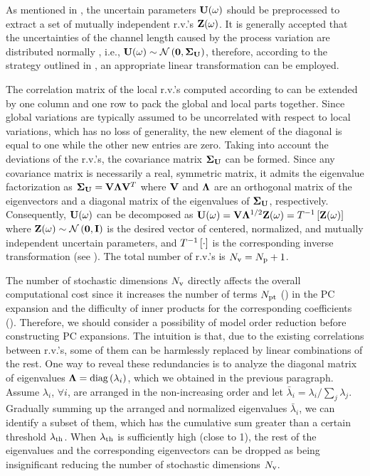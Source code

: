 As mentioned in , the uncertain parameters $\mathbf{U}(\omega)$ should be preprocessed to extract a set of mutually independent r.v.'s $\mathbf{Z}(\omega)$. It is generally accepted that the uncertainties of the channel length caused by the process variation are distributed normally \cite{juan2011, juan2012, srivastava2010}, i.e., $\vU(\o) \sim \normal{\vZero}{\mCov_\vU}$, therefore, according to the strategy outlined in , an appropriate linear transformation can be employed.

The correlation matrix of the local r.v.'s computed according to  can be extended by one column and one row to pack the global and local parts together. Since global variations are typically assumed to be uncorrelated with respect to local variations, which has no loss of generality, the new element of the diagonal is equal to one while the other new entries are zero. Taking into account the deviations of the r.v.'s, the covariance matrix $\mCov_\vU$ can be formed. Since any covariance matrix is necessarily a real, symmetric matrix, it admits the eigenvalue factorization \cite{press2007} as $\mCov_\vU = \m{V} \m{\Lambda} \m{V}^T$ where $\m{V}$ and $\m{\Lambda}$ are an orthogonal matrix of the eigenvectors and a diagonal matrix of the eigenvalues of $\mCov_\vU$, respectively. Consequently, $\mathbf{U}(\omega)$ can be decomposed as $\vU(\o) = \m{V} \m{\Lambda}^\ifrac{1}{2} \vZ(\o) = \oInvTransform{\vZ(\o)}$ where $\vZ(\o) \sim \normal{\vZero}{\mI}$ is the desired vector of centered, normalized, and mutually independent uncertain parameters, and $T^{-1}\left[\cdot\right]$ is the corresponding inverse transformation (see ). The total number of r.v.'s is ${N_\text{v}} = {N_\text{p}} + 1$.

The number of stochastic dimensions ${N_\text{v}}$ directly affects the overall computational cost since it increases the number of terms ${N_\text{pt}}$ () in the PC expansion and the difficulty of inner products for the corresponding coefficients (). Therefore, we should consider a possibility of model order reduction before constructing PC expansions. The intuition is that, due to the existing correlations between r.v.'s, some of them can be harmlessly replaced by linear combinations of the rest. One way to reveal these redundancies is to analyze the diagonal matrix of eigenvalues $\m{\Lambda} = \diag{ \lambda_i }$, which we obtained in the previous paragraph. Assume $\lambda_i$, $\forall i$, are arranged in the non-increasing order and let $\bar{\lambda}_i = \lambda_i / \sum_j \lambda_j$. Gradually summing up the arranged and normalized eigenvalues $\bar{\lambda}_i$, we can identify a subset of them, which has the cumulative sum greater than a certain threshold $\lambda_\text{th}$. When $\lambda_\text{th}$ is sufficiently high (close to 1), the rest of the eigenvalues and the corresponding eigenvectors can be dropped as being insignificant reducing the number of stochastic dimensions ${N_\text{v}}$.

